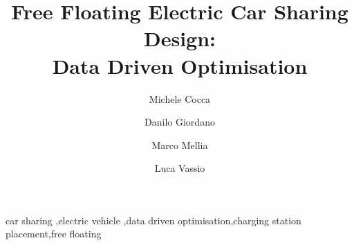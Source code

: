 \documentclass[review, letterpaper,3p, 11pt]{elsarticle}
\begin{document}
\doublespacing

\begin{frontmatter}


\title{Free Floating Electric Car Sharing Design: \\Data Driven Optimisation}


\author[poli]{Michele Cocca}
\author[dauin]{Danilo Giordano}
\author[poli]{Marco Mellia}
\author[poli]{Luca Vassio}


\address[poli]{Department of Electronics and Telecommunications, Politecnico di Torino, Italy.}
\address[dauin]{Department of Control and Computer Engineering, Politecnico di Torino, Italy.}




\begin{keyword}
car sharing \sep electric vehicle \sep data driven optimisation\sep charging station placement\sep free floating
\end{keyword}

\end{frontmatter}











\doublespacing


\appendix

\end{document}
